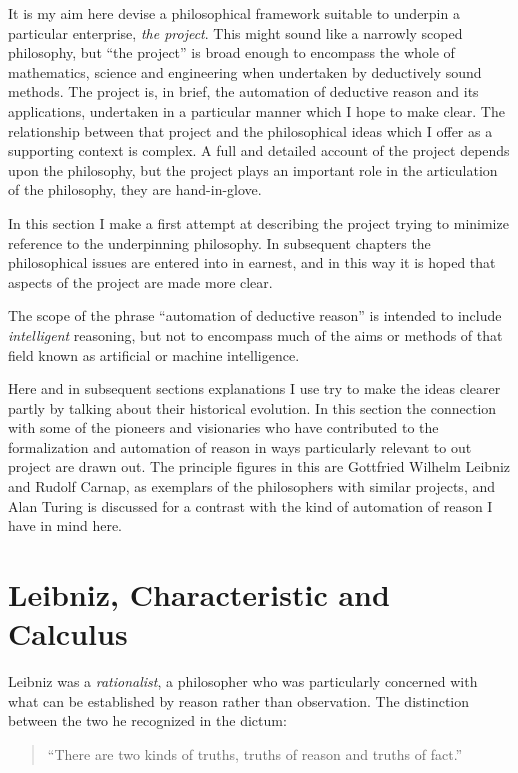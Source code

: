 It is my aim here devise a philosophical framework suitable to
underpin a particular enterprise, \emph{the project}. 
This might sound like a narrowly scoped philosophy, but ``the
project'' is broad enough to encompass the whole of mathematics,
science and engineering when undertaken by deductively sound methods. 
The project is, in brief, the automation of deductive reason and its
applications, undertaken in a particular manner which I hope to make
clear. 
The relationship between that project and the philosophical ideas
which I offer as a supporting context is complex. 
A full and detailed account of the project depends upon the
philosophy, but the project plays an important role in the
articulation of the philosophy, they are hand-in-glove. 

In this section I make a first attempt at describing the project
trying to minimize reference to the underpinning philosophy. 
In subsequent chapters the philosophical issues are entered into in
earnest, and in this way it is hoped that aspects of the project are
made more clear. 

The scope of the phrase ``automation of deductive reason'' is intended
to include \emph{intelligent} reasoning, but not to encompass much of
the aims or methods of that field known as artificial or machine
intelligence. 

Here and in subsequent sections explanations I use try to make the
ideas clearer partly by talking about their historical evolution. 
In this section the connection with some of the pioneers and
visionaries who have contributed to the formalization and automation
of reason in ways particularly relevant to out project are drawn out. 
The principle figures in this are Gottfried Wilhelm Leibniz and Rudolf
Carnap, as exemplars of the philosophers with similar projects, and
Alan Turing is discussed for a contrast with the kind of automation of
reason I have in mind here. 

\section{Leibniz, Characteristic and Calculus}

Leibniz was a \emph{rationalist}, a philosopher who was particularly
concerned with what can be established by reason rather than
observation. 
The distinction between the two he recognized in the dictum:

\begin{quote}
``There are two kinds of truths, truths of reason and truths of fact.''
\end{quote}

